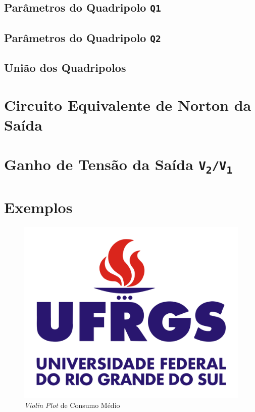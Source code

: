 \documentclass{report}
\let\oldsection\section
\renewcommand\section{\clearpage\oldsection}
\begin{document}
\subsection{Parâmetros do Quadripolo \texttt{Q1}}

\subsection{Parâmetros do Quadripolo \texttt{Q2}}

\subsection{União dos Quadripolos}

\section{Circuito Equivalente de Norton da Saída}

\section{Ganho de Tensão da Saída \texorpdfstring{\texttt{V\textsubscript{2}/V\textsubscript{1}}}{V2/V1}}

\section{Exemplos}

\begin{figure}[h!]
  \centering
  \includegraphics[width=.85\linewidth]{images/logos/UFRGS.png}
  \caption{\label{img:combination_dist} \textit{Violin Plot} de Consumo Médio}
\end{figure}
\end{document}
